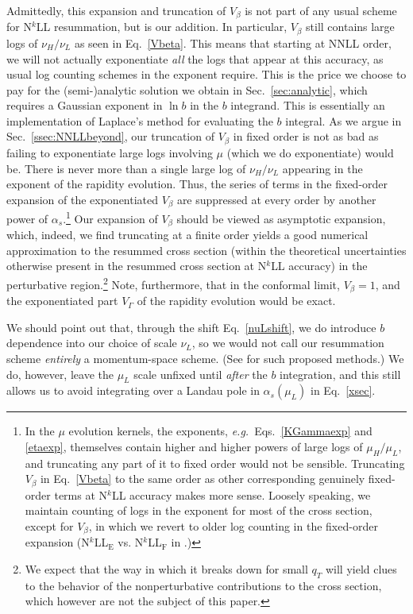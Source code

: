 \documentclass[a4,letterpaper,11pt]{article}
\newcommand{\as}{\alpha_s}
\newcommand{\eg}{\emph{e.g.}~}
\newcommand{\eq}[1]{Eq.~\eqref{#1}}
\newcommand{\eqs}[2]{Eqs.~\eqref{#1} and \eqref{#2}}
\renewcommand{\sec}[1]{Sec.~\ref{sec:#1}}
\newcommand{\ssec}[1]{Sec.~\ref{ssec:#1}}
\begin{document}
Admittedly, this expansion and truncation of $V_\beta$ is not part of any usual scheme for N$^k$LL resummation, but is our addition. In particular, $V_\beta$ still contains large logs of $\nu_H/\nu_L$ as seen in \eq{Vbeta}. This means that starting at NNLL order, we will not actually exponentiate \emph{all} the logs that appear at this accuracy, as usual log counting schemes in the exponent require. This is the price we choose to pay for the (semi-)analytic solution we obtain in \sec{analytic}, which requires a Gaussian exponent in $\ln b$ in the $b$ integrand. This is essentially an implementation of Laplace's method for evaluating the $b$ integral. As we argue in \ssec{NNLLbeyond}, our truncation of $V_\beta$ in fixed order is not as bad as failing to exponentiate large logs involving $\mu$ (which we do exponentiate) would be. There is never more than a single large log of $\nu_H/\nu_L$ appearing in the exponent of the rapidity evolution. Thus, the series of terms in the fixed-order expansion of the exponentiated $V_\beta$ are suppressed at every order by another power of $\as$.\footnote{In the $\mu$ evolution kernels, the exponents, \eg \eqs{KGammaexp}{etaexp}, themselves contain higher and higher powers of large logs of $\mu_H/\mu_L$, and truncating any part of it to fixed order would not be sensible. Truncating $V_\beta$ in \eq{Vbeta} to the same order as other corresponding genuinely fixed-order terms at N$^k$LL accuracy makes more sense. Loosely speaking, we maintain counting of logs in the exponent for most of the cross section, except for $V_\beta$, in which we revert to older log counting in the fixed-order expansion (N$^k$LL$_\text{E}$ vs. N$^k$LL$_\text{F}$ in \cite{Chiu:2007dg}.)} Our expansion of $V_\beta$ should be viewed as asymptotic expansion, which, indeed, we find truncating at a finite order yields a good numerical approximation to the resummed cross section (within the theoretical uncertainties otherwise present in the resummed cross section at N$^k$LL accuracy) in the perturbative region.\footnote{We expect that the way in which it breaks down for small $q_T$ will yield clues to the behavior of the nonperturbative contributions to the cross section, which however are not the subject of this paper.} Note, furthermore, that in the conformal limit, $V_\beta =1$, and the exponentiated part $V_\Gamma$ of the rapidity evolution would be exact.

We should point out that, through the shift \eq{nuLshift}, we do introduce $b$ dependence into our choice of scale $\nu_L$, so we would not call our resummation scheme \emph{entirely} a momentum-space scheme. (See \cite{Ebert:2016gcn,Monni:2016ktx}  for such proposed methods.) We do, however, leave the $\mu_L$ scale unfixed until \emph{after} the $b$ integration, and this still allows us to avoid integrating over a Landau pole in $\as(\mu_L)$ in \eq{xsec}. 
\end{document}
